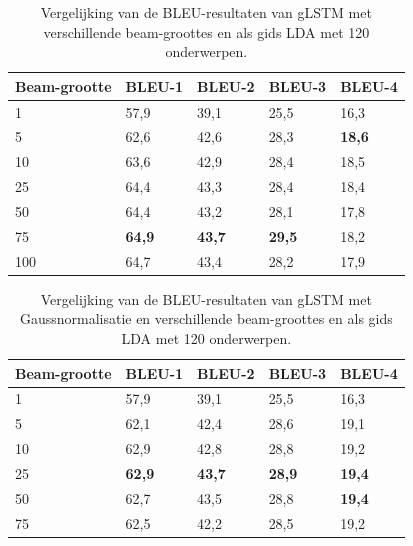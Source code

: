     \begin{table}
    	\centering
    	\begin{tabular}{lllll}
    		Beam-grootte                   & BLEU-1 & BLEU-2 & BLEU-3 & BLEU-4  \\ \hline
	    	1	      & 57,9   & 39,1   & 25,5   & 16,3        \\ 
    		5         & 62,6   & 42,6   & 28,3   & \textbf{18,6}     \\
    		10         & 63,6   & 42,9   & 28,4   & 18,5    \\
    		25        & 64,4   & 43,3   & 28,4   & 18,4     \\
    		50		  & 64,4   & 43,2   & 28,1   & 17,8    \\
    		75        & \textbf{64,9}   & \textbf{43,7}   & \textbf{29,5}   & 18,2    \\
    	    100		  & 64,7   & 43,4   & 28,2   & 17,9     \\\hline
    	\end{tabular}
    	\caption{Vergelijking van de BLEU-resultaten van gLSTM met verschillende beam-groottes en als gids LDA met 120 onderwerpen.}	
    	\label{table:beam}
    \end{table}

    \begin{table}
    	\centering
    	\begin{tabular}{lllll}
    		Beam-grootte & BLEU-1 & BLEU-2 & BLEU-3 & BLEU-4  \\ \hline
    		1	      & 57,9   & 39,1   & 25,5   & 16,3        \\ 
    		5         & 62,1   & 42,4   & 28,6   & 19,1     \\
    		10        & 62,9   & 42,8   & 28,8   & 19,2    \\
    		25        & \textbf{62,9}   & \textbf{43,7}   & \textbf{28,9}   & \textbf{19,4}     \\
    		50		  & 62,7   & 43,5   & 28,8   & \textbf{19,4}    \\
    		75        & 62,5   & 42,2   & 28,5   & 19,2    \\ \hline
    	\end{tabular}
    	\caption{Vergelijking van de BLEU-resultaten van gLSTM met Gaussnormalisatie en verschillende beam-groottes en als gids LDA met 120 onderwerpen.}	
    	\label{table:beam_gauss}
    \end{table}

